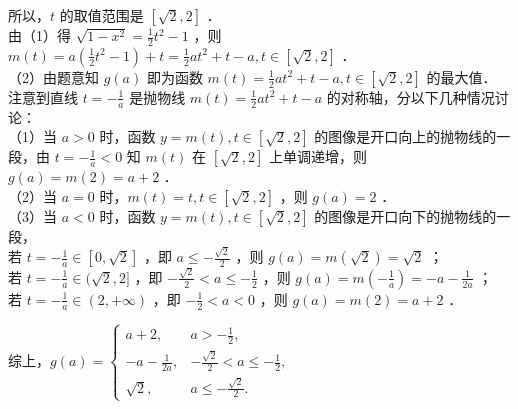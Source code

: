 \documentclass[10pt]{article}
\begin{document}
所以，\(t\) 的取值范围是 \([\sqrt{2}, 2]\) ．\\
由（1）得 \(\sqrt{1-x^{2}}=\frac{1}{2} t^{2}-1\) ，则 \(m(t)=a\left(\frac{1}{2} t^{2}-1\right)+t=\frac{1}{2} a t^{2}+t-a, t \in[\sqrt{2}, 2]\) ．\\
（2）由题意知 \(g(a)\) 即为函数 \(m(t)=\frac{1}{2} a t^{2}+t-a, t \in[\sqrt{2}, 2]\) 的最大值．\\
注意到直线 \(t=-\frac{1}{a}\) 是抛物线 \(m(t)=\frac{1}{2} a t^{2}+t-a\) 的对称轴，分以下几种情况讨论：\\
（1）当 \(a>0\) 时，函数 \(y=m(t), t \in[\sqrt{2}, 2]\) 的图像是开口向上的抛物线的一段，由 \(t=-\frac{1}{a}<0\) 知 \(m(t)\) 在 \([\sqrt{2}, 2]\) 上单调递增，则 \(g(a)=m(2)=a+2\) ．\\
（2）当 \(a=0\) 时，\(m(t)=t, t \in[\sqrt{2}, 2]\) ，则 \(g(a)=2\) ．\\
（3）当 \(a<0\) 时，函数 \(y=m(t), t \in[\sqrt{2}, 2]\) 的图像是开口向下的抛物线的一段，\\
若 \(t=-\frac{1}{a} \in[0, \sqrt{2}]\) ，即 \(a \leqslant-\frac{\sqrt{2}}{2}\) ，则 \(g(a)=m(\sqrt{2})=\sqrt{2}\) ；\\
若 \(t=-\frac{1}{a} \in(\sqrt{2}, 2]\) ，即 \(-\frac{\sqrt{2}}{2}<a \leqslant-\frac{1}{2}\) ，则 \(g(a)=m\left(-\frac{1}{a}\right)=-a-\frac{1}{2 a}\) ；\\
若 \(t=-\frac{1}{a} \in(2,+\infty)\) ，即 \(-\frac{1}{2}<a<0\) ，则 \(g(a)=m(2)=a+2\) ．

综上，\(g(a)= \begin{cases}a+2, & a>-\frac{1}{2}, \\ -a-\frac{1}{2 a}, & -\frac{\sqrt{2}}{2}<a \leqslant-\frac{1}{2}, \\ \sqrt{2}, & a \leqslant-\frac{\sqrt{2}}{2} .\end{cases}\)
\end{document}
